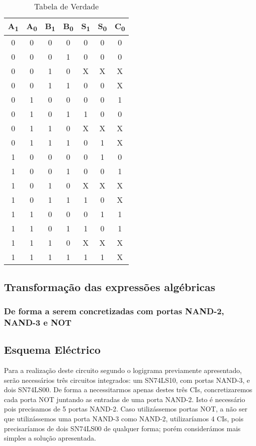 \documentclass[a4paper,12pt]{article}
\begin{document}
\begin{table}[h]

\centering
\begin{tabular}{ || c  c | c c || c c| c || }
\hline
A\textsubscript{1} & A\textsubscript{0} & B\textsubscript{1} & B\textsubscript{0} & S\textsubscript{1} & S\textsubscript{0} & C\textsubscript{0} \\ \hline
0   & 0  & 0  & 0  & 0  & 0  & 0  \\ \hline
0   & 0  & 0  & 1  & 0  & 0  & 0  \\ \hline
0   & 0  & 1  & 0  & X  & X  & X  \\ \hline
0   &  0  & 1   & 1   & 0   & 0   & X   \\ \hline
0   &  1  &  0  & 0   & 0   & 0   & 1   \\ \hline
0   &  1  &  0  & 1   & 1   & 0   & 0   \\ \hline
0   &  1  &  1  & 0   & X   & X   & X   \\ \hline
0   &  1  &  1  & 1   & 0   & 1   & X   \\ \hline
1   &  0  &  0  & 0   & 0   & 1   & 0   \\ \hline
1   &  0  &  0  & 1   & 0   & 0   & 1   \\ \hline
1   &  0  &  1  & 0   & X   & X   & X   \\ \hline
1   &  0  &  1  & 1   & 1   & 0   & X   \\ \hline
1   &  1  &  0  & 0   & 0   & 1   & 1   \\ \hline
1   &  1  &  0  & 1   & 1   & 0   & 1   \\ \hline
1   &  1  &  1  & 0   & X   & X   & X   \\ \hline
1   &  1  &  1  & 1   & 1   & 1   & X   \\ \hline
\end{tabular}
\caption{Tabela de Verdade} %
\end{table}

\subsection{Transformação das expressões algébricas}

\subsubsection{De forma a serem concretizadas com portas NAND-2, NAND-3 e NOT}


\subsection{Esquema Eléctrico}
Para a realização deste circuito segundo o logigrama previamente apresentado, 
serão necessários três circuitos integrados: um SN74LS10, com portas NAND-3,
e dois SN74LS00. De forma a necessitarmos apenas destes três CIs,
concretizaremos cada porta NOT juntando as entradas de uma porta NAND-2.
Isto é necessário pois precisamos de 5 portas NAND-2. Caso utilizássemos portas
NOT, a não ser que utilizássemos uma porta NAND-3 como NAND-2, utilizaríamos 
4 CIs, pois precisaríamos de dois SN74LS00 de qualquer forma;
porém considerámos mais simples a solução apresentada.
\end{document}
